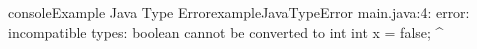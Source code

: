 \begin{pseudocode}{console}{Example Java Type Error}{exampleJavaTypeError}
main.java:4: error: incompatible types: boolean cannot be converted to int
	int x = false;
	        ^
\end{pseudocode}
